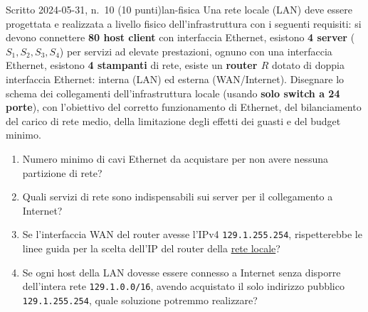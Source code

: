 \documentclass{report}
\begin{document}
\begin{Exercise}{Scritto 2024-05-31, n.\ 10 (10 punti)}{lan-fisica}
Una rete locale (LAN) deve essere progettata e realizzata a livello fisico
dell'infrastruttura con i seguenti requisiti: si devono connettere \textbf{80 host
client} con interfaccia Ethernet, esistono \textbf{4 server} ($S_1,S_2,S_3,S_4$)
per servizi ad elevate prestazioni, ognuno con una interfaccia Ethernet, esistono
\textbf{4 stampanti} di rete, esiste un \textbf{router $R$} dotato di doppia
interfaccia Ethernet: interna (LAN) ed esterna (WAN/Internet). Disegnare lo schema
dei collegamenti dell'infrastruttura locale (usando \textbf{solo switch a 24
porte}), con l'obiettivo del corretto funzionamento di Ethernet, del bilanciamento
del carico di rete medio, della limitazione degli effetti dei guasti e del budget
minimo.
\begin{enumerate}
\item[a)] Numero minimo di cavi Ethernet da acquistare per non avere nessuna
partizione di rete?
\item[b)] Quali servizi di rete sono indispensabili sui server per il collegamento
a Internet?
\item[c)] Se l'interfaccia WAN del router avesse l'IPv4 \texttt{129.1.255.254},
rispetterebbe le linee guida per la scelta dell'IP del router della
\underline{rete locale}?
\item[d)] Se ogni host della LAN dovesse essere connesso a Internet senza disporre
dell'intera rete \texttt{129.1.0.0/16}, avendo acquistato il solo indirizzo
pubblico \texttt{129.1.255.254}, quale soluzione potremmo realizzare?
\end{enumerate}
\end{Exercise}
\end{document}
